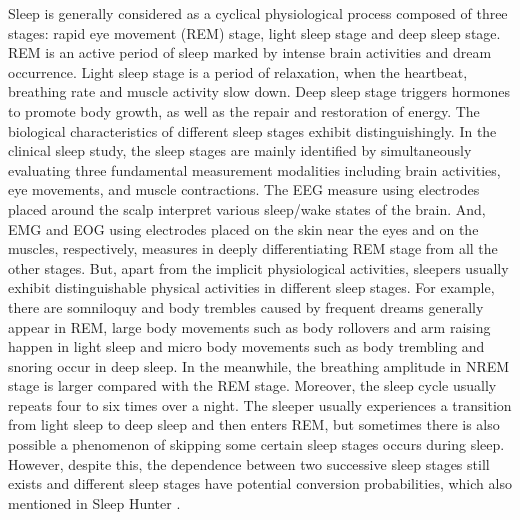 Sleep is generally considered as a cyclical physiological process composed of three stages: rapid eye movement (REM) stage, light sleep stage and deep sleep stage. REM is an active period of sleep marked by intense brain activities and dream occurrence. Light sleep stage is a period of relaxation, when the heartbeat, breathing rate and muscle activity slow down. Deep sleep stage triggers hormones to promote body growth, as well as the repair and restoration of energy.  The biological characteristics of different sleep stages exhibit distinguishingly. In the clinical sleep study, the sleep stages are mainly identified by simultaneously evaluating three fundamental measurement modalities including brain activities, eye movements, and muscle contractions. The EEG measure using electrodes placed around the scalp interpret various sleep/wake states of the brain. And, EMG and EOG using electrodes placed on the skin near the eyes and on the muscles, respectively, measures in deeply differentiating REM stage from all the other stages. But, apart from the implicit physiological activities, sleepers usually exhibit distinguishable physical activities in different sleep stages. For example, there are somniloquy and body trembles caused by frequent dreams generally appear in REM, large body movements such as body rollovers and arm raising happen in light sleep and micro body movements such as body trembling and snoring occur in deep sleep.  In the meanwhile, the breathing amplitude in NREM stage is larger compared with the REM stage. Moreover, the sleep cycle usually repeats four to six times over a night. The sleeper usually experiences a transition from light sleep to deep sleep and then enters REM, but sometimes there is also possible a phenomenon of skipping some certain sleep stages occurs during sleep. However, despite this, the dependence between two successive sleep stages still exists and different sleep stages have potential conversion probabilities, which also mentioned in Sleep Hunter \cite{gu2016sleep}.

